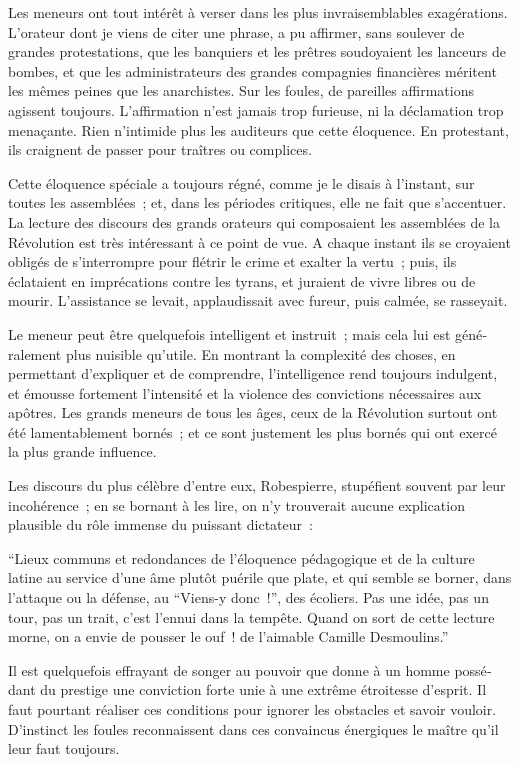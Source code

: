 \documentclass[french,twoside]{book} %
\begin{document}
Les meneurs ont tout intérêt à verser dans les plus invraisemblables exagérations. L’orateur dont je viens de citer une phrase, a pu affirmer, sans soulever de grandes protestations, que les banquiers et les prêtres soudoyaient les lanceurs de bombes, et que les administrateurs des grandes compagnies financières méritent les mêmes peines que les anarchistes. Sur les foules, de pareilles affirmations agissent toujours. L’affirmation n’est jamais trop furieuse, ni la déclamation trop menaçante. Rien n’inti­mide plus les auditeurs que cette éloquence. En protestant, ils craignent de passer pour traîtres ou complices.\par
Cette éloquence spéciale a toujours régné, comme je le disais à l’instant, sur toutes les assemblées ; et, dans les périodes critiques, elle ne fait que s’accentuer. La lecture des discours des grands orateurs qui composaient les assemblées de la Révolution est très intéressant à ce point de vue. A chaque instant ils se croyaient obligés de s’inter­rompre pour flétrir le crime et exalter la vertu ; puis, ils éclataient en imprécations contre les tyrans, et juraient de vivre libres ou de mourir. L’assistance se levait, applaudissait avec fureur, puis calmée, se rasseyait.\par
Le meneur peut être quelquefois intelligent et instruit ; mais cela lui est géné­ralement plus nuisible qu’utile. En montrant la complexité des choses, en permettant d’expliquer et de comprendre, l’intelligence rend toujours indulgent, et émousse fortement l’intensité et la violence des convictions nécessaires aux apôtres. Les grands meneurs de tous les âges, ceux de la Révolution surtout ont été lamentablement bornés ; et ce sont justement les plus bornés qui ont exercé la plus grande influence.\par
Les discours du plus célèbre d’entre eux, Robes­pierre, stupéfient souvent par leur incohérence ; en se bornant à les lire, on n’y trouverait aucune explication plausible du rôle immense du puissant dictateur :\par
“Lieux communs et redondances de l’éloquence pédagogique et de la culture latine au service d’une âme plu­tôt puérile que plate, et qui semble se borner, dans l’attaque ou la défense, au “Viens-y donc !”, des écoliers. Pas une idée, pas un tour, pas un trait, c’est l’ennui dans la tempête. Quand on sort de cette lecture morne, on a envie de pousser le ouf ! de l’aimable Camille Desmoulins.”\par
Il est quelquefois effrayant de songer au pouvoir que donne à un homme possé­dant du prestige une conviction forte unie à une extrême étroitesse d’esprit. Il faut pourtant réaliser ces conditions pour ignorer les obstacles et savoir vouloir. D’instinct les foules reconnaissent dans ces convaincus énergiques le maître qu’il leur faut toujours.\par
\end{document}
